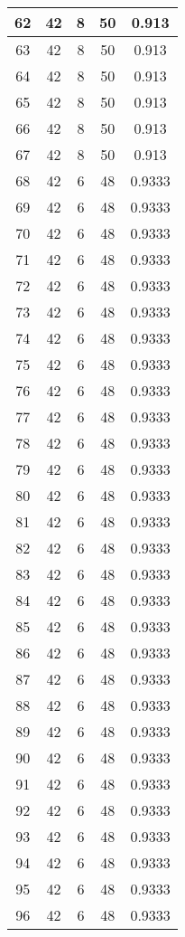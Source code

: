 \documentclass[letterpaper, 12pt]{article}
\begin{document}
\begin{longtable}{|c|c|c|c|c|}
\hline
62 & 42 & 8 & 50 & 0.913 \\
\hline
63 & 42 & 8 & 50 & 0.913 \\
\hline
64 & 42 & 8 & 50 & 0.913 \\
\hline
65 & 42 & 8 & 50 & 0.913 \\
\hline
66 & 42 & 8 & 50 & 0.913 \\
\hline
67 & 42 & 8 & 50 & 0.913 \\
\hline
68 & 42 & 6 & 48 & 0.9333 \\
\hline
69 & 42 & 6 & 48 & 0.9333 \\
\hline
70 & 42 & 6 & 48 & 0.9333 \\
\hline
71 & 42 & 6 & 48 & 0.9333 \\
\hline
72 & 42 & 6 & 48 & 0.9333 \\
\hline
73 & 42 & 6 & 48 & 0.9333 \\
\hline
74 & 42 & 6 & 48 & 0.9333 \\
\hline
75 & 42 & 6 & 48 & 0.9333 \\
\hline
76 & 42 & 6 & 48 & 0.9333 \\
\hline
77 & 42 & 6 & 48 & 0.9333 \\
\hline
78 & 42 & 6 & 48 & 0.9333 \\
\hline
79 & 42 & 6 & 48 & 0.9333 \\
\hline
80 & 42 & 6 & 48 & 0.9333 \\
\hline
81 & 42 & 6 & 48 & 0.9333 \\
\hline
82 & 42 & 6 & 48 & 0.9333 \\
\hline
83 & 42 & 6 & 48 & 0.9333 \\
\hline
84 & 42 & 6 & 48 & 0.9333 \\
\hline
85 & 42 & 6 & 48 & 0.9333 \\
\hline
86 & 42 & 6 & 48 & 0.9333 \\
\hline
87 & 42 & 6 & 48 & 0.9333 \\
\hline
88 & 42 & 6 & 48 & 0.9333 \\
\hline
89 & 42 & 6 & 48 & 0.9333 \\
\hline
90 & 42 & 6 & 48 & 0.9333 \\
\hline
91 & 42 & 6 & 48 & 0.9333 \\
\hline
92 & 42 & 6 & 48 & 0.9333 \\
\hline
93 & 42 & 6 & 48 & 0.9333 \\
\hline
94 & 42 & 6 & 48 & 0.9333 \\
\hline
95 & 42 & 6 & 48 & 0.9333 \\
\hline
96 & 42 & 6 & 48 & 0.9333 \\

\end{longtable}
\end{document}
